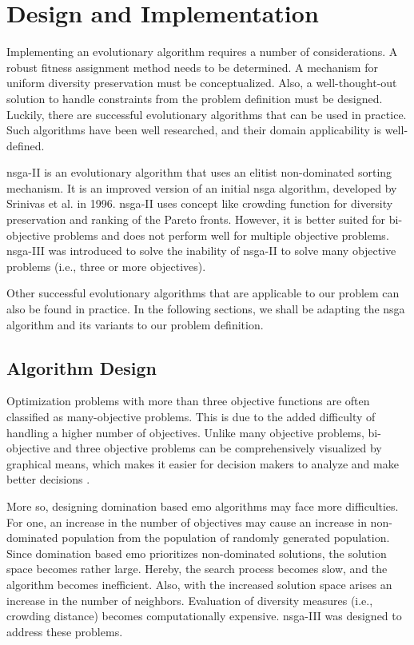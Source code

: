\chapter{Design and Implementation}\label{chapter:prototype_implementation}

Implementing an evolutionary algorithm requires a number of considerations. A robust fitness assignment method needs to be determined. A mechanism for uniform diversity preservation must be conceptualized. Also, a well-thought-out solution to handle constraints from the problem definition must be designed. Luckily, there are successful evolutionary algorithms that can be used in practice. Such algorithms have been well researched, and their domain applicability is well-defined. 

\Gls{nsga}-II \parencite{Jain2013AnOptimization} is an evolutionary algorithm that uses an elitist non-dominated sorting mechanism. It is an improved version of an initial \gls{nsga} algorithm, developed by  Srinivas et al. \parencite{Srinivas1994MuiltiobjectiveAlgorithms} in 1996. 
\Gls{nsga}-II uses concept like crowding function for diversity preservation and ranking of the Pareto fronts. However, it is better suited for bi-objective problems and does not perform well for multiple objective problems. \Gls{nsga}-III \parencite{Mkaouer2015Many-objectiveNSGA-III} was introduced to solve the inability of \gls{nsga}-II to solve many objective problems (i.e., three or more objectives).

Other successful evolutionary algorithms that are applicable to our problem can also be found in practice. In the following sections, we shall be adapting the \gls{nsga} algorithm and its variants to our problem definition.

\section{Algorithm Design}
Optimization problems with more than three objective functions are often classified as many-objective problems. This is due to the added difficulty of handling a higher number of objectives. Unlike many objective problems, bi-objective and three objective problems can be comprehensively visualized by graphical means, which makes it easier for decision makers to analyze and make better decisions \parencite{Deb2013AnConstraints}. 

More so, designing domination based \gls{emo} algorithms may face more difficulties. For one, an increase in the number of objectives may cause an increase in non-dominated population from the population of randomly generated population. Since domination based \gls{emo} prioritizes non-dominated solutions, the solution space becomes rather large. Hereby, the search process becomes slow, and the algorithm becomes inefficient. Also, with the increased solution space arises an increase in the number of neighbors. Evaluation of diversity measures (i.e., crowding distance) becomes computationally expensive. \gls{nsga}-III was designed to address these problems. 


